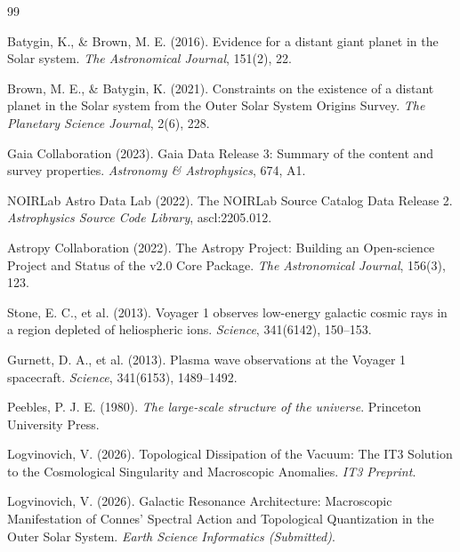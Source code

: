 \documentclass[11pt,a4paper]{article}
\theoremstyle{remark}
\begin{document}
\begin{thebibliography}{99}

Batygin, K., \& Brown, M. E. (2016).
\newblock Evidence for a distant giant planet in the Solar system.
\newblock \emph{The Astronomical Journal}, 151(2), 22.

Brown, M. E., \& Batygin, K. (2021).
\newblock Constraints on the existence of a distant planet in the Solar system from the Outer Solar System Origins Survey.
\newblock \emph{The Planetary Science Journal}, 2(6), 228.

Gaia Collaboration (2023).
\newblock Gaia Data Release 3: Summary of the content and survey properties.
\newblock \emph{Astronomy \& Astrophysics}, 674, A1.

NOIRLab Astro Data Lab (2022).
\newblock The NOIRLab Source Catalog Data Release 2.
\newblock \emph{Astrophysics Source Code Library}, ascl:2205.012.

Astropy Collaboration (2022).
\newblock The Astropy Project: Building an Open-science Project and Status of the v2.0 Core Package.
\newblock \emph{The Astronomical Journal}, 156(3), 123.

Stone, E. C., et al. (2013).
\newblock Voyager 1 observes low-energy galactic cosmic rays in a region depleted of heliospheric ions.
\newblock \emph{Science}, 341(6142), 150--153.

Gurnett, D. A., et al. (2013).
\newblock Plasma wave observations at the Voyager 1 spacecraft.
\newblock \emph{Science}, 341(6153), 1489--1492.

Peebles, P. J. E. (1980).
\newblock \emph{The large-scale structure of the universe}.
\newblock Princeton University Press.

Logvinovich, V. (2026).
\newblock Topological Dissipation of the Vacuum: The IT3 Solution to the Cosmological Singularity and Macroscopic Anomalies.
\newblock \emph{IT3 Preprint}.

Logvinovich, V. (2026).
\newblock Galactic Resonance Architecture: Macroscopic Manifestation of Connes' Spectral Action and Topological Quantization in the Outer Solar System.
\newblock \emph{Earth Science Informatics (Submitted)}.

\end{thebibliography}
\end{document}
